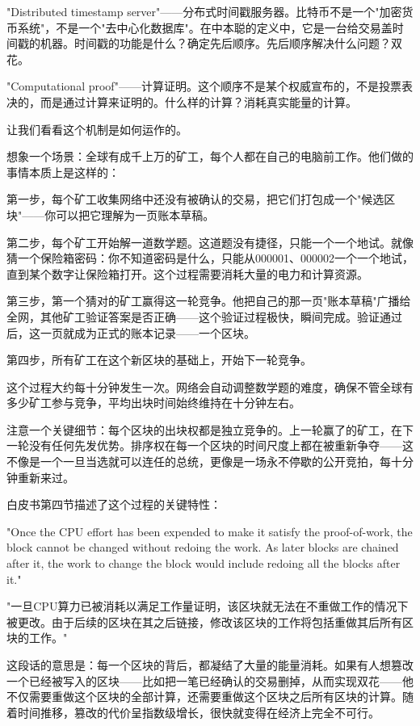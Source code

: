 \documentclass[a4paper,12pt,openany]{ctexbook}
\newenvironment{quoting}{%
  \par\vspace{0.5em}%
  \begin{list}{}{%
    \setlength{\leftmargin}{2em}%
    \setlength{\rightmargin}{2em}%
    \setlength{\parsep}{0.3em}%
    \setlength{\itemsep}{0pt}%
    \setlength{\topsep}{0pt}%
  }%
  \item\relax
}{%
  \end{list}%
  \par\vspace{0.5em}%
}
\begin{document}
"Distributed timestamp server"——分布式时间戳服务器。比特币不是一个"加密货币系统"，不是一个"去中心化数据库"。在中本聪的定义中，它是一台给交易盖时间戳的机器。时间戳的功能是什么？确定先后顺序。先后顺序解决什么问题？双花。

"Computational proof"——计算证明。这个顺序不是某个权威宣布的，不是投票表决的，而是通过计算来证明的。什么样的计算？消耗真实能量的计算。

让我们看看这个机制是如何运作的。

想象一个场景：全球有成千上万的矿工，每个人都在自己的电脑前工作。他们做的事情本质上是这样的：

第一步，每个矿工收集网络中还没有被确认的交易，把它们打包成一个"候选区块"——你可以把它理解为一页账本草稿。

第二步，每个矿工开始解一道数学题。这道题没有捷径，只能一个一个地试。就像猜一个保险箱密码：你不知道密码是什么，只能从000001、000002一个一个地试，直到某个数字让保险箱打开。这个过程需要消耗大量的电力和计算资源。

第三步，第一个猜对的矿工赢得这一轮竞争。他把自己的那一页"账本草稿"广播给全网，其他矿工验证答案是否正确——这个验证过程极快，瞬间完成。验证通过后，这一页就成为正式的账本记录——一个区块。

第四步，所有矿工在这个新区块的基础上，开始下一轮竞争。

这个过程大约每十分钟发生一次。网络会自动调整数学题的难度，确保不管全球有多少矿工参与竞争，平均出块时间始终维持在十分钟左右。

注意一个关键细节：每个区块的出块权都是独立竞争的。上一轮赢了的矿工，在下一轮没有任何先发优势。排序权在每一个区块的时间尺度上都在被重新争夺——这不像是一个一旦当选就可以连任的总统，更像是一场永不停歇的公开竞拍，每十分钟重新来过。

白皮书第四节描述了这个过程的关键特性：


\begin{quoting}
\small
"Once the CPU effort has been expended to make it satisfy the proof-of-work, the block cannot be changed without redoing the work. As later blocks are chained after it, the work to change the block would include redoing all the blocks after it."

"一旦CPU算力已被消耗以满足工作量证明，该区块就无法在不重做工作的情况下被更改。由于后续的区块在其之后链接，修改该区块的工作将包括重做其后所有区块的工作。"
\end{quoting}


这段话的意思是：每一个区块的背后，都凝结了大量的能量消耗。如果有人想篡改一个已经被写入的区块——比如把一笔已经确认的交易删掉，从而实现双花——他不仅需要重做这个区块的全部计算，还需要重做这个区块之后所有区块的计算。随着时间推移，篡改的代价呈指数级增长，很快就变得在经济上完全不可行。
\end{document}
